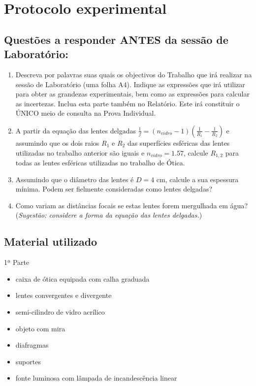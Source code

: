 \documentclass[a4paper,12pt]{article}      %
\begin{document}
\newpage
\section{\sf Protocolo experimental}
\subsection{\sf Questões a responder ANTES da sessão de Laboratório:}
\begin{enumerate}
\item Descreva por palavras suas quais os objectivos do Trabalho que irá realizar na sessão de Laboratório (uma folha A4). Indique as expressões que irá utilizar para obter as grandezas experimentais, bem como as expressões para calcular as incertezas. Inclua esta parte também no Relatório. Este irá constituir o ÚNICO meio de consulta na Prova Individual.
	
\item A partir da equação das lentes delgadas $\frac{1}{f} = (n_{vidro}-1) \left(\frac{1}{R_1} -\frac{1}{R_2}\right)$ e assumindo que os dois raios $R_1$ e $R_2$ das superfícies esféricas das lentes utilizadas no trabalho anterior são iguais e $ n_{vidro}=1.57$, calcule $R_{1,2}$ para todas as lentes esféricas utilizadas no trabalho de Ótica.
\item Assumindo que o diâmetro das lentes é $D=4$ cm, calcule a sua espessura mínima. Podem ser fielmente consideradas como lentes delgadas?
\item Como variam as distâncias focais se estas lentes forem mergulhada em água? (\emph{Sugestão: considere a forma da equação das lentes delgadas.})
\end{enumerate}

\subsection{\sf Material utilizado}
1ª Parte
\begin{itemize}
\item caixa de ótica equipada com calha graduada
\item lentes convergentes e divergente
\item semi-cilindro de vidro acrílico
\item objeto com mira
\item diafragmas
\item suportes
\item fonte luminosa com lâmpada de incandescência linear
\end{itemize}
\end{document}
